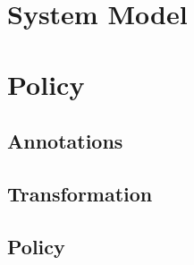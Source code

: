 \section{System Model}
\section{Policy}
\subsection{Annotations}
\subsection{Transformation}
\subsection{Policy}